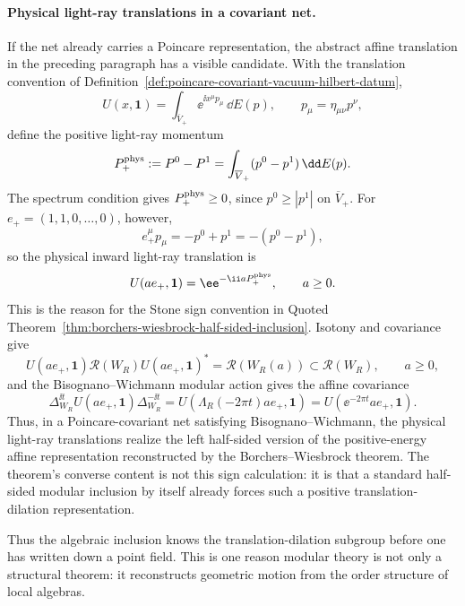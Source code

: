\paragraph{Physical light-ray translations in a covariant net.}
If the net already carries a Poincare representation, the abstract affine
translation in the preceding paragraph has a visible candidate.  With the
translation convention of
Definition~\ref{def:poincare-covariant-vacuum-hilbert-datum},
\[
  U(x,\mathbf 1)
  =
  \int_{\overline V_+}\ee^{\ii x^\mu p_\mu}\,\dd E(p),
  \qquad p_\mu=\eta_{\mu\nu}p^\nu ,
\]
define the positive light-ray momentum
\[
  P_+^{\rm phys}:=P^0-P^1
  =
  \int_{\overline V_+}(p^0-p^1)\,\dd E(p).
\]
The spectrum condition gives \(P_+^{\rm phys}\ge0\), since
\(p^0\ge |p^1|\) on \(\overline V_+\).  For
\(e_+=(1,1,0,\ldots,0)\), however,
\[
  e_+^\mu p_\mu=-p^0+p^1=-(p^0-p^1),
\]
so the physical inward light-ray translation is
\[
  U(ae_+,\mathbf 1)=\ee^{-\ii aP_+^{\rm phys}},\qquad a\ge0 .
\]
This is the reason for the Stone sign convention in
Quoted Theorem~\ref{thm:borchers-wiesbrock-half-sided-inclusion}.  Isotony
and covariance give
\[
  U(ae_+,\mathbf 1)\mathcal R(W_R)U(ae_+,\mathbf 1)^*
  =
  \mathcal R(W_R(a))
  \subset
  \mathcal R(W_R),
  \qquad a\ge0,
\]
and the Bisognano--Wichmann modular action gives the affine covariance
\[
  \Delta_{W_R}^{\ii t}U(ae_+,\mathbf 1)\Delta_{W_R}^{-\ii t}
  =
  U(\Lambda_R(-2\pi t)ae_+,\mathbf 1)
  =
  U(\ee^{-2\pi t}ae_+,\mathbf 1).
\]
Thus, in a Poincare-covariant net satisfying Bisognano--Wichmann, the
physical light-ray translations realize the left half-sided version of the
positive-energy affine representation reconstructed by the
Borchers--Wiesbrock theorem.  The theorem's converse content is not this sign
calculation: it is that a standard half-sided modular inclusion by itself
already forces such a positive translation-dilation representation.

Thus the algebraic inclusion knows the translation-dilation subgroup before
one has written down a point field.  This is one reason modular theory is not
only a structural theorem: it reconstructs geometric motion from the order
structure of local algebras.

